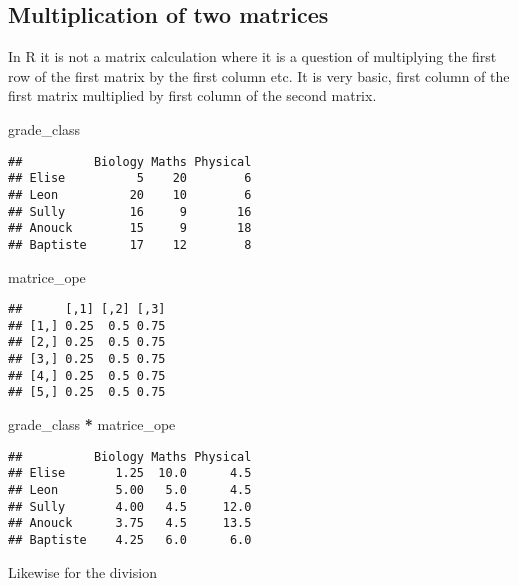 \documentclass[
]{article}
\newenvironment{Shaded}{\begin{snugshade}}{\end{snugshade}}
\newcommand{\NormalTok}[1]{#1}
\newcommand{\SpecialCharTok}[1]{\textcolor[rgb]{0.81,0.36,0.00}{\textbf{#1}}}
\begin{document}
\hypertarget{multiplication-of-two-matrices}{%
\subsection{Multiplication of two
matrices}\label{multiplication-of-two-matrices}}

In R it is not a matrix calculation where it is a question of
multiplying the first row of the first matrix by the first column etc.
It is very basic, first column of the first matrix multiplied by first
column of the second matrix.

\begin{Shaded}
\begin{Highlighting}[]
\NormalTok{grade\_class}
\end{Highlighting}
\end{Shaded}

\begin{verbatim}
##          Biology Maths Physical
## Elise          5    20        6
## Leon          20    10        6
## Sully         16     9       16
## Anouck        15     9       18
## Baptiste      17    12        8
\end{verbatim}

\begin{Shaded}
\begin{Highlighting}[]
\NormalTok{matrice\_ope}
\end{Highlighting}
\end{Shaded}

\begin{verbatim}
##      [,1] [,2] [,3]
## [1,] 0.25  0.5 0.75
## [2,] 0.25  0.5 0.75
## [3,] 0.25  0.5 0.75
## [4,] 0.25  0.5 0.75
## [5,] 0.25  0.5 0.75
\end{verbatim}

\begin{Shaded}
\begin{Highlighting}[]
\NormalTok{grade\_class }\SpecialCharTok{*}\NormalTok{ matrice\_ope}
\end{Highlighting}
\end{Shaded}

\begin{verbatim}
##          Biology Maths Physical
## Elise       1.25  10.0      4.5
## Leon        5.00   5.0      4.5
## Sully       4.00   4.5     12.0
## Anouck      3.75   4.5     13.5
## Baptiste    4.25   6.0      6.0
\end{verbatim}

Likewise for the division
\end{document}
